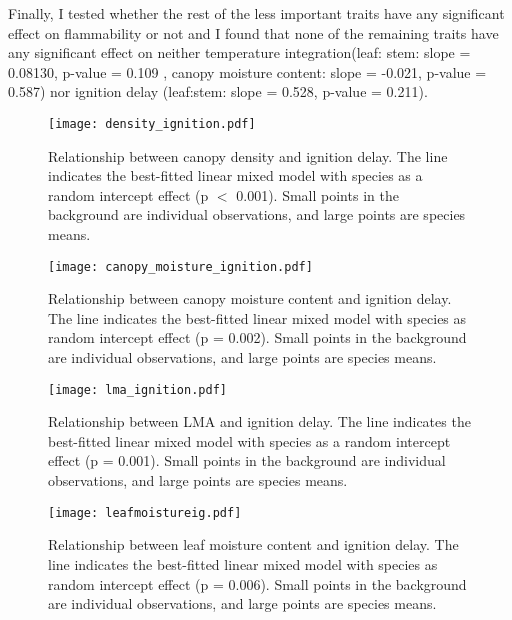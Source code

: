 \documentclass[12pt]{report}
\begin{document}
Finally, I tested whether the rest of the less important traits have any significant effect on flammability or not and I found that none of the remaining traits have any significant effect on neither temperature integration(leaf: stem: slope = 0.08130, p-value = 0.109 , canopy moisture content: slope = -0.021,
p-value = 0.587) nor ignition delay (leaf:stem: slope = 0.528, p-value = 0.211).



\begin{figure}
    \centering
    \texttt{[image: density\_ignition.pdf]}
    \caption{Relationship between canopy density and ignition delay. The line indicates the best-fitted linear mixed model with species as a random intercept effect (p $<$ 0.001). Small points in the background are individual observations, and large points are species means.}
\end{figure}

\begin{figure}
    \centering
    \texttt{[image: canopy\_moisture\_ignition.pdf]}
    \caption{Relationship between canopy moisture content and ignition delay. The line indicates the best-fitted linear mixed model with species as random intercept effect (p = 0.002). Small points in the background are individual observations, and large points are species means.}
\end{figure}

\begin{figure}
    \centering
    \texttt{[image: lma\_ignition.pdf]}
    \caption{Relationship between LMA and ignition delay. The line indicates the best-fitted linear mixed model with species as a random intercept effect (p = 0.001). Small points in the background are individual observations, and large points are species means.}
\end{figure}



\begin{figure}
    \centering
    \texttt{[image: leafmoistureig.pdf]}
    \caption{Relationship between leaf moisture content and ignition delay. The line indicates the best-fitted linear mixed model with species as random intercept effect (p = 0.006). Small points in the background are individual observations, and large points are species means.}
    \label{fig:my_label}
\end{figure}
\end{document}
